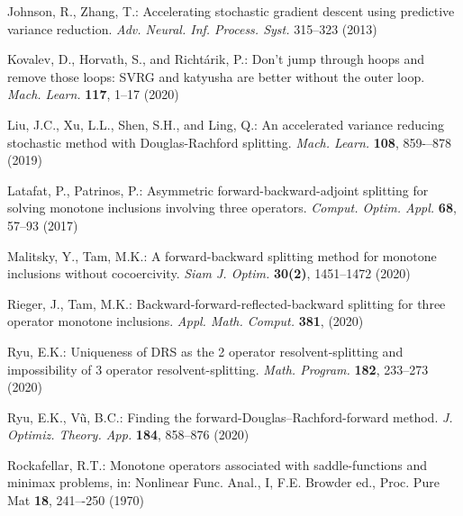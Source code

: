 \documentclass[a4paper,12pt]{article}
\theoremstyle{definition}
\begin{document}
\begin{thebibliography}{99}


Johnson, R., Zhang, T.: Accelerating stochastic gradient descent using predictive variance reduction. \textit{Adv. Neural. Inf. Process. Syst.} 315--323 (2013)

Kovalev, D., Horvath, S., and Richt\'{a}rik, P.: Don't jump through hoops and remove those loops:
SVRG and katyusha are better without the outer loop. \textit{Mach. Learn.} \textbf{117}, 1--17 (2020)

Liu, J.C., Xu, L.L., Shen, S.H., and Ling, Q.: An accelerated variance reducing stochastic method with Douglas-Rachford splitting. \textit{Mach. Learn.} \textbf{108}, 859-–878 (2019)

Latafat, P., Patrinos, P.: Asymmetric forward-backward-adjoint splitting for solving monotone inclusions involving three operators. \textit{Comput. Optim. Appl.} \textbf{68}, 57--93 (2017)

Malitsky, Y., Tam, M.K.: A forward-backward splitting method for monotone inclusions without cocoercivity. \textit{Siam J. Optim.} \textbf{30(2)}, 1451--1472 (2020)


Rieger, J., Tam, M.K.: Backward-forward-reflected-backward splitting for three operator monotone inclusions. \textit{Appl. Math. Comput.} \textbf{381}, (2020)

Ryu, E.K.: Uniqueness of DRS as the 2 operator resolvent-splitting and impossibility of 3 operator resolvent-splitting. \textit{Math. Program.} \textbf{182}, 233--273 (2020)

Ryu, E.K., V\~{u}, B.C.: Finding the forward-Douglas–Rachford-forward method. \textit{J. Optimiz. Theory. App.} \textbf{184}, 858--876 (2020)

Rockafellar, R.T.: Monotone operators associated with saddle-functions and minimax problems, in: Nonlinear Func. Anal., I, F.E. Browder ed., Proc. Pure Mat \textbf{18}, 241–-250 (1970)
%


\end{thebibliography}
\end{document}
